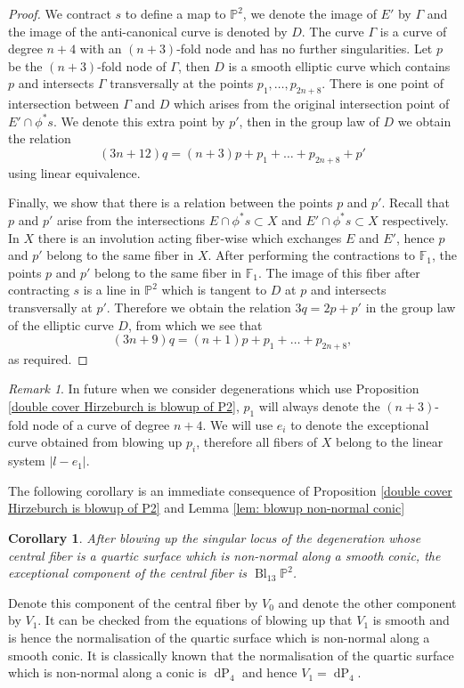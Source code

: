 \documentclass[a4paper]{amsart}
\theoremstyle{definition}
\theoremstyle{plain}
\newtheorem{cor}[defn]{Corollary}
\theoremstyle{remark}
\newtheorem{rk}[defn]{Remark}
\newcommand{\PS}{\mathbb{P}}
\newcommand{\F}{\mathbb{F}}
\begin{document}
\begin{proof}
We contract $s$ to define a map to $\PS^2$, we denote the image of $E'$ by $\Gamma$ and the image of the anti-canonical curve is denoted by $D$. The curve $\Gamma$ is a curve of degree $n+4$ with an $(n+3)$-fold node and has no further singularities. Let $p$ be the $(n+3)$-fold node of $\Gamma$, then $D$ is a smooth elliptic curve which contains $p$ and intersects $\Gamma$ transversally at the points $p_1,\dots,p_{2n+8}$. There is one point of intersection between $\Gamma$ and $D$ which arises from the original intersection point of $E'\cap\phi^*s$. We denote this extra point by $p'$, then in the group law of $D$ we obtain the relation
$$(3n+12)q=(n+3)p+p_1+\dots +p_{2n+8}+p'$$
using linear equivalence.

Finally, we show that there is a relation between the points $p$ and $p'$. Recall that $p$ and $p'$ arise from the intersections $E\cap \phi^*s\subset X$ and $E'\cap\phi^*s\subset X$ respectively. In $X$ there is an involution acting fiber-wise which exchanges $E$ and $E'$, hence $p$ and $p'$ belong to the same fiber in $X$. After performing the contractions to $\F_1$, the points $p$ and $p'$ belong to the same fiber in $\F_1$. The image of this fiber after contracting $s$ is a line in $\PS^2$ which is tangent to $D$ at $p$ and intersects transversally at $p'$. Therefore we obtain the relation $3q=2p+p'$ in the group law of the elliptic curve $D$, from which we see that
$$(3n+9)q=(n+1)p+p_1+\dots +p_{2n+8},$$
as required.
\end{proof}

\begin{rk}
In future when we consider degenerations which use Proposition \ref{double cover Hirzeburch is blowup of P2}, $p_1$ will always denote the $(n+3)$-fold node of a curve of degree $n+4$. We will use $e_i$ to denote the exceptional curve obtained from blowing up $p_i$, therefore all fibers of $X$ belong to the linear system $|l-e_1|$. 
\end{rk}
The following corollary is an immediate consequence of Proposition \ref{double cover Hirzeburch is blowup of P2} and Lemma \ref{lem: blowup non-normal conic}
\begin{cor}
After blowing up the singular locus of the degeneration whose central fiber is a quartic surface which is non-normal along a smooth conic, the exceptional component of the central fiber is $\operatorname{Bl}_{13}\PS^2$.
\end{cor}

Denote this component of the central fiber by $V_0$ and denote the other component by $V_1$. It can be checked from the equations of blowing up that $V_1$ is smooth and is hence the normalisation of the quartic surface which is non-normal along a smooth conic. It is classically known \cite[Theorem 8.6.4]{Dolg12} that the normalisation of the quartic surface which is non-normal along a conic is $\operatorname{dP}_4$ and hence $V_1=\operatorname{dP}_4$.
\end{document}
